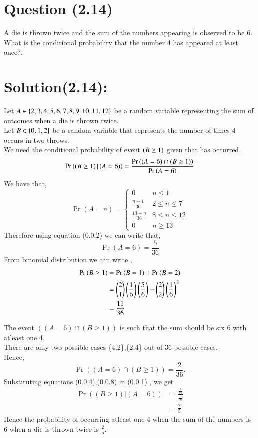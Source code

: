 \documentclass[journal,12pt,twocolumn]{IEEEtran}
\begin{document}
\section*{Question (2.14)}
A die is thrown twice and the sum of the numbers appearing is observed to be 6. What is the conditional probability that the number 4 has appeared at least once?.
\section*{Solution(2.14):}
Let $A \in \left\{2,3,4,5,6,7,8,9,10,11,12\right\}$ be a random variable representing the sum of outcomes when a die is thrown twice.\\
Let $B \in \left\{0,1,2\right\}$  be a random variable that represents the number of times 4 occurs in two throws.\\
We need the conditional probability of event $\left(B \geq 1\right)$ given that  has occurred.\\ 
\begin{equation}
    \Pr{\ensuremath{\left(\left(B \geq 1\right)|\left(A=6\right)\right)}}
    =\frac{\Pr{((A=6)\cap(B \geq 1))}}{\Pr{\ensuremath{\left(A=6\right)}}}
\end{equation}
We have that,\\
\begin{equation}
\Pr{(A=n)}=
\begin{cases}
    0 & n \leq 1\\
    \frac{n-1}{36} & 2\leq n \leq 7\\
    \frac{13-n}{36} & 8 \leq n \leq 12\\
    0 & n \geq 13
\end{cases}
\end{equation}
Therefore using equation (0.0.2) we can write that,
\begin{equation}
    \Pr{(A=6)}=\frac{5}{36}
\end{equation}
From binomial distribution we can write ,
\begin{align}
    \Pr{(B \geq 1)}&=\Pr{(B =1)}+\Pr{(B=2)}\\ &= \binom{2}{1} \left(\frac{1}{6}\right)\left(\frac{5}{6}\right)+\binom{2}{2} \left(\frac{1}{6}\right)^2\\
    &=\frac{11}{36}
\end{align}

The event $((A=6) \cap (B\geq 1))$ is such that the sum should be six 6 with atleast one 4.\\
There are only two possible cases \{4,2\},\{2,4\} out of 36 possible cases.\\
Hence,\\
\begin{equation}
    \Pr{((A=6) \cap (B\geq 1))}=\frac{2}{36}.    
\end{equation}
Substituting equations (0.0.4),(0.0.8) in (0.0.1) , we get\\
\begin{equation}
\begin{split}
\Pr((B \geq 1)|(A=6
))&=\frac{\frac{2}{36}}{\frac{5}{36}}\\
&=\frac{2}{5}.
\end{split}
\end{equation}
Hence the probability of occurring atleast one 4 when the sum of the numbers is 6 when a die is thrown twice is $\frac{2}{5}$. 
\end{document}
